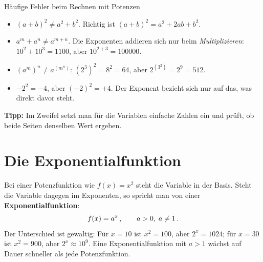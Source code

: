 \begin{importantbox}[]{Häufige Fehler beim Rechnen mit Potenzen}
    \begin{itemize}[itemsep=1.5pt]
        \item $(a + b)^2 \neq a^2 + b^2$. Richtig ist $(a+b)^2 = a^2 + 2ab + b^2$.
        \item $a^m + a^n \neq a^{m+n}$. Die Exponenten addieren sich nur beim \textit{Multiplizieren}: $10^2 + 10^3 = 1100$, aber $10^{2+3} = \num{100000}$.
        \item $\left(a^m\right)^n \neq a^{\left(m^n\right)}$: $\left(2^3\right)^2 = 8^2 = 64$, aber $2^{\left(3^2\right)} = 2^9 = 512$.
        \item $-2^2 = -4$, aber $(-2)^2 = +4$. Der Exponent bezieht sich nur auf das, was direkt davor steht.
    \end{itemize}
    \textbf{Tipp:} Im Zweifel setzt man für die Variablen einfache Zahlen ein und prüft, ob beide Seiten denselben Wert ergeben.
\end{importantbox}

\section{Die Exponentialfunktion}\label{sec: Exponentialfunktion}
Bei einer Potenzfunktion wie $f(x) = x^2$ steht die Variable in der Basis. Steht die Variable dagegen im Exponenten, so spricht man von einer \textbf{Exponentialfunktion}:
\begin{equation}\label{eq: exponentialfunktion_allg}
    f(x) = a^x \,{,}\, \qquad a > 0,\; a \neq 1 \,.
\end{equation}
Der Unterschied ist gewaltig: Für $x = 10$ ist $x^2 = 100$, aber $2^x = 1024$; für $x = 30$ ist $x^2 = 900$, aber $2^x \approx 10^9$. Eine Exponentialfunktion mit $a > 1$ wächst auf Dauer schneller als jede Potenzfunktion.

